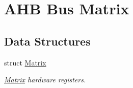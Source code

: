 \hypertarget{group__SAMS70__MATRIX}{}\section{A\+HB Bus Matrix}
\label{group__SAMS70__MATRIX}
\subsection*{Data Structures}
\begin{DoxyCompactItemize}
\item 
struct \mbox{\hyperlink{structMatrix}{Matrix}}
\begin{DoxyCompactList}\small\item\em \mbox{\hyperlink{structMatrix}{Matrix}} hardware registers. \end{DoxyCompactList}\end{DoxyCompactItemize}
